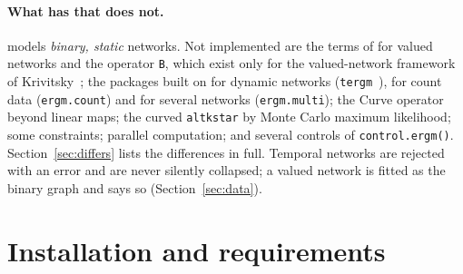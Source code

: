 \paragraph{What \ergm{} has that \nwergm{} does not.} \nwergm{} models \emph{binary, static} networks. Not implemented are the \nValued{} terms of \ergm{} for valued networks and the operator \texttt{B}, which exist only for the valued-network framework of Krivitsky~\cite{krivitsky2012}; the packages built on \ergm{} for dynamic networks (\texttt{tergm}~\cite{krivitsky2014}), for count data (\texttt{ergm.count}) and for several networks (\texttt{ergm.multi}); the Curve operator beyond linear maps; the curved \texttt{altkstar} by Monte Carlo maximum likelihood; some constraints; parallel computation; and several controls of \texttt{control.ergm()}. Section~\ref{sec:differs} lists the differences in full. Temporal networks are rejected with an error and are never silently collapsed; a valued network is fitted as the binary graph and says so (Section~\ref{sec:data}).

\section{Installation and requirements}


